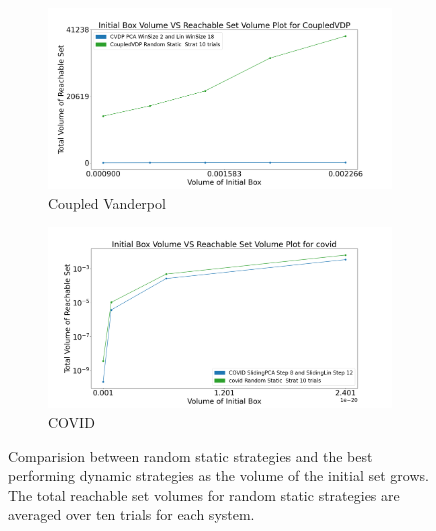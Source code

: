 \begin{figure}[h!]
    \hspace{-1.5em}
    \begin{subfigure}{0.5\textwidth}
    \centering
    \includegraphics[width=1.1\textwidth, height=0.75\textwidth]{figures/InitVolVSReachVol/CVDPInitReachVolRanStrat.png}
    \caption{Coupled Vanderpol}
    \end{subfigure}%
    \begin{subfigure}{0.5\textwidth}
    \centering
    \includegraphics[width=1.1\textwidth, height=0.75\textwidth]{figures/InitVolVSReachVol/CovidInitReachVolRanStrat.png}
    \caption{COVID}
    \end{subfigure}

    \caption{Comparision between random static strategies and the best performing dynamic strategies as the volume of the initial set grows. The total reachable set volumes for random static strategies are averaged over ten trials for each system.}
    \label{fig:RanStaticStratComp}
\end{figure}
\clearpage
